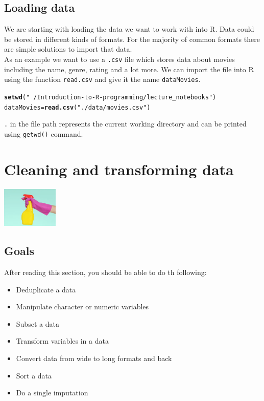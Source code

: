 \documentclass[a4paper]{article}\usepackage[]{graphicx}\usepackage[]{xcolor}
\makeatletter
\newcommand{\hlstr}[1]{\textcolor[rgb]{0.192,0.494,0.8}{#1}}%
\newcommand{\hlstd}[1]{\textcolor[rgb]{0.345,0.345,0.345}{#1}}%
\newcommand{\hlkwb}[1]{\textcolor[rgb]{0.69,0.353,0.396}{#1}}%
\newcommand{\hlkwd}[1]{\textcolor[rgb]{0.737,0.353,0.396}{\textbf{#1}}}%
\newenvironment{kframe}{%
 \def\at@end@of@kframe{}%
 \ifinner\ifhmode%
  \def\at@end@of@kframe{\end{minipage}}%
  \begin{minipage}{\columnwidth}%
 \fi\fi%
 \def\FrameCommand##1{\hskip\@totalleftmargin \hskip-\fboxsep
 \colorbox{shadecolor}{##1}\hskip-\fboxsep
     \hskip-\linewidth \hskip-\@totalleftmargin \hskip\columnwidth}%
 \MakeFramed {\advance\hsize-\width
   \@totalleftmargin\z@ \linewidth\hsize
   \@setminipage}}%
 {\par\unskip\endMakeFramed%
 \at@end@of@kframe}
\newenvironment{knitrout}{}{} %
\makeatother
\begin{document}
\subsection{Loading data}
\noindent We are starting with loading the data we want to work with into R. Data could be stored in different kinds of formats. For the majority of common formats there are simple solutions to import that data.\\
As an example we want to use a \texttt{.csv} file which stores data about movies including the name, genre, rating and a lot more. We can import the file into R using the function \texttt{read.csv} and give it the name  \texttt{dataMovies}.

\begin{knitrout}
\color{fgcolor}\begin{kframe}
\begin{alltt}
\hlkwd{setwd}\hlstd{(}\hlstr{"~/Introduction-to-R-programming/lecture_notebooks"}\hlstd{)}
\hlstd{dataMovies} \hlkwb{=} \hlkwd{read.csv}\hlstd{(}\hlstr{"./data/movies.csv"}\hlstd{)}
\end{alltt}
\end{kframe}
\end{knitrout}
\noindent \texttt{.} in the file path represents the current working directory and  can be printed using \texttt{getwd()} command.





\section{Cleaning and transforming data}

\begin{center}
 \includegraphics[width = 0.2\textwidth]{./image/cleaning_data.png}    
\end{center} 

\subsection*{Goals}
After reading this section, you should be able to do th following:
\begin{itemize}
\item Deduplicate a data
\item Manipulate character or numeric variables 
\item Subset a data
\item Transform variables in a data
\item Convert data from wide to long formats and back
\item Sort a data
\item Do a single imputation
\end{itemize} 
\end{document}
